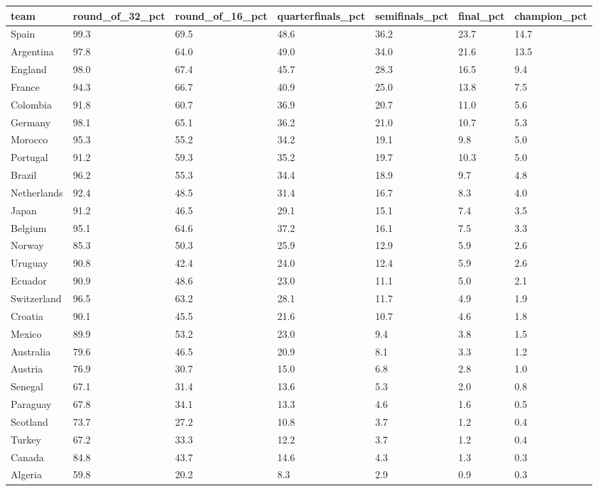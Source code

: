 \begin{tabular}{lllllll}
\toprule
team & round\_of\_32\_pct & round\_of\_16\_pct & quarterfinals\_pct & semifinals\_pct & final\_pct & champion\_pct \\
\midrule
Spain & 99.3 & 69.5 & 48.6 & 36.2 & 23.7 & 14.7 \\
Argentina & 97.8 & 64.0 & 49.0 & 34.0 & 21.6 & 13.5 \\
England & 98.0 & 67.4 & 45.7 & 28.3 & 16.5 & 9.4 \\
France & 94.3 & 66.7 & 40.9 & 25.0 & 13.8 & 7.5 \\
Colombia & 91.8 & 60.7 & 36.9 & 20.7 & 11.0 & 5.6 \\
Germany & 98.1 & 65.1 & 36.2 & 21.0 & 10.7 & 5.3 \\
Morocco & 95.3 & 55.2 & 34.2 & 19.1 & 9.8 & 5.0 \\
Portugal & 91.2 & 59.3 & 35.2 & 19.7 & 10.3 & 5.0 \\
Brazil & 96.2 & 55.3 & 34.4 & 18.9 & 9.7 & 4.8 \\
Netherlands & 92.4 & 48.5 & 31.4 & 16.7 & 8.3 & 4.0 \\
Japan & 91.2 & 46.5 & 29.1 & 15.1 & 7.4 & 3.5 \\
Belgium & 95.1 & 64.6 & 37.2 & 16.1 & 7.5 & 3.3 \\
Norway & 85.3 & 50.3 & 25.9 & 12.9 & 5.9 & 2.6 \\
Uruguay & 90.8 & 42.4 & 24.0 & 12.4 & 5.9 & 2.6 \\
Ecuador & 90.9 & 48.6 & 23.0 & 11.1 & 5.0 & 2.1 \\
Switzerland & 96.5 & 63.2 & 28.1 & 11.7 & 4.9 & 1.9 \\
Croatia & 90.1 & 45.5 & 21.6 & 10.7 & 4.6 & 1.8 \\
Mexico & 89.9 & 53.2 & 23.0 & 9.4 & 3.8 & 1.5 \\
Australia & 79.6 & 46.5 & 20.9 & 8.1 & 3.3 & 1.2 \\
Austria & 76.9 & 30.7 & 15.0 & 6.8 & 2.8 & 1.0 \\
Senegal & 67.1 & 31.4 & 13.6 & 5.3 & 2.0 & 0.8 \\
Paraguay & 67.8 & 34.1 & 13.3 & 4.6 & 1.6 & 0.5 \\
Scotland & 73.7 & 27.2 & 10.8 & 3.7 & 1.2 & 0.4 \\
Turkey & 67.2 & 33.3 & 12.2 & 3.7 & 1.2 & 0.4 \\
Canada & 84.8 & 43.7 & 14.6 & 4.3 & 1.3 & 0.3 \\
Algeria & 59.8 & 20.2 & 8.3 & 2.9 & 0.9 & 0.3 \\

\end{tabular}
